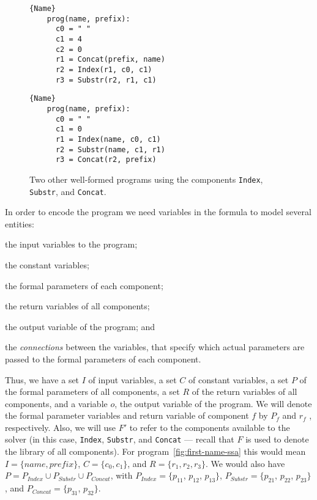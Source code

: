 \begin{figure}
\noindent
\begin{minipage}{.45\textwidth}
  \begin{lstlisting}[frame=tlrb]{Name}
    prog(name, prefix):
      c0 = " "
      c1 = 4
      c2 = 0
      r1 = Concat(prefix, name)
      r2 = Index(r1, c0, c1)
      r3 = Substr(r2, r1, c1)
  \end{lstlisting}
\end{minipage}\hfill
\begin{minipage}{.45\textwidth}
  \begin{lstlisting}[frame=tlrb]{Name}
    prog(name, prefix):
      c0 = " "
      c1 = 0
      r1 = Index(name, c0, c1)
      r2 = Substr(name, c1, r1)
      r3 = Concat(r2, prefix)
\end{lstlisting}
\end{minipage}
\caption{Two other well-formed programs using the components \lstinline{Index},
  \lstinline{Substr}, and \lstinline{Concat}.}
\label{fig:other-valid-programs}
\end{figure}

In order to encode the program we need variables in the formula to model several
entities:
\begin{enumerate*}[(1)]
\item the input variables to the program;
\item the constant variables;
\item the formal parameters of each component;
\item the return variables of all components;
\item the output variable of the program; and
\item the \textit{connections} between the variables, that specify which
  actual parameters are passed to the formal parameters of each component.
\end{enumerate*}
Thus, we have a set $I$ of input variables, a set $C$ of constant variables, a
set $P$ of the formal parameters of all components, a set $R$ of the return
variables of all components, and a variable $o$, the output variable of the
program. We will denote the formal parameter variables and return variable of
component $f$ by $P_f$ and $r_f$ , respectively. Also, we will use $F'$ to refer
to the components available to the solver (in this case, \lstinline{Index},
\lstinline{Substr}, and \lstinline{Concat} --- recall that $F$ is used to denote
the library of all components).
For program~\ref{fig:first-name-ssa} this would mean $I = \{name, prefix\}$,
$C = \{c_0, c_1\}$, and $R = \{r_1, r_2, r_3\}$. We would also have
$P = P_{Index} \cup P_{Substr} \cup P_{Concat}$, with
$P_{Index} = \{p_{11}$, $p_{12}$, $p_{13}\}$,
$P_{Substr} = \{p_{21}$, $p_{22}$, $p_{23}\}$, and
$P_{Concat} = \{p_{31}$, $p_{32}\}$.

